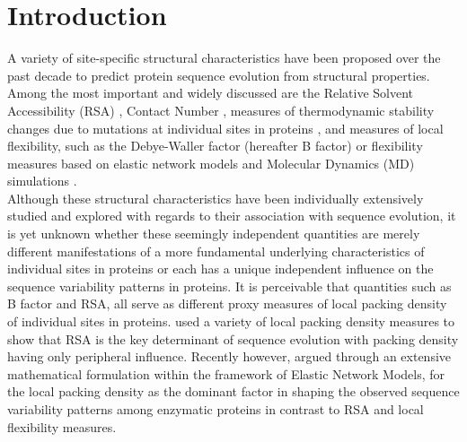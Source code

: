 \documentclass[11pt]{article}
\begin{document}
\def\thefootnote{\fnsymbol{footnote}}
\setcounter{footnote}{0}
%

\section{Introduction}
\label{sec:intro}

    A variety of site-specific structural characteristics have been proposed over the past decade to predict protein sequence evolution from structural properties. Among the most important and widely discussed are the Relative Solvent Accessibility (RSA) \citep[e.g.,][]{goldman_assessing_1998, bustamante_solvent_2000, conant_solvent_2009, franzosa_structural_2009, ramsey_relationship_2011, scherrer_modeling_2012, meyer_integrating_2013, meyer_cross-species_2013, yeh_local_2014, yeh_site-specific_2014, shahmoradi_predicting_2014, sikosek_biophysics_2014, meyer_geometric_2015}, Contact Number \citep[e.g.,][]{rodionov_sequence_1998, hamelryck_amino_2005, liao_protein_2005, bloom_structural_2006, huang_mechanistic_2014, marcos_too_2015, yeh_site-specific_2014, yeh_local_2014, shahmoradi_predicting_2014, meyer_geometric_2015}, measures of thermodynamic stability changes due to mutations at individual sites in proteins \citep[e.g.,][]{wilke_predicting_2005, echave_relationship_2014}, and measures of local flexibility, such as the Debye-Waller factor (hereafter B factor) \citep[e.g.,][]{liao_protein_2005, shih_evolutionary_2012, shahmoradi_predicting_2014} or flexibility measures based on elastic network models \citep[e.g.,][]{liu_sequence_2012} and Molecular Dynamics (MD) simulations \citep[e.g.,][]{shahmoradi_predicting_2014}. \\

    Although these structural characteristics have been individually extensively studied and explored with regards to their association with sequence evolution, it is yet unknown whether these seemingly independent quantities are merely different manifestations of a more fundamental underlying characteristics of individual sites in proteins or each has a unique independent influence on the sequence variability patterns in proteins. It is perceivable that quantities such as B factor and RSA, all serve as different proxy measures of local packing density of individual sites in proteins. \citet{franzosa_structural_2009} used a variety of local packing density measures to show that RSA is the key determinant of sequence evolution with packing density having only peripheral influence. Recently however, \citet{huang_mechanistic_2014} argued through an extensive mathematical formulation within the framework of Elastic Network Models, for the local packing density as the dominant factor in shaping the observed sequence variability patterns among enzymatic proteins in contrast to RSA and local flexibility measures. \\
\end{document}
